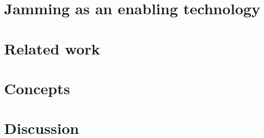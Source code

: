 \section{Jamming as an enabling technology}
\label{ch:jamming:enabling-technology} 


\section{Related work}
\label{ch:jamming:related-work} 


\section{Concepts}
\label{ch:jamming:concepts} 


\section{Discussion}
